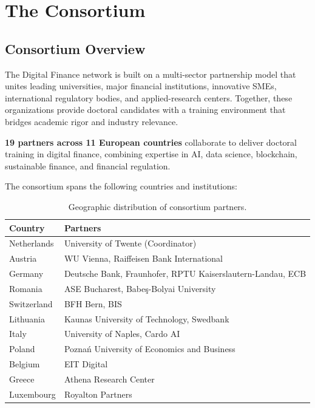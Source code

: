 \chapter{The Consortium}
\label{ch:consortium}

\section{Consortium Overview}
\label{sec:consortium-overview}

The Digital Finance network is built on a multi-sector partnership model that
unites leading universities, major financial institutions, innovative SMEs,
international regulatory bodies, and applied-research centers.  Together, these
organizations provide doctoral candidates with a training environment that
bridges academic rigor and industry relevance.

\begin{highlightbox}
\textbf{19 partners across 11 European countries} collaborate to deliver
doctoral training in digital finance, combining expertise in AI, data science,
blockchain, sustainable finance, and financial regulation.
\end{highlightbox}

\vspace{4pt}

\noindent The consortium spans the following countries and institutions:

\vspace{4pt}

\begin{table}[h]
\centering
\begin{tabularx}{\textwidth}{@{}l X@{}}
  \toprule
  \textbf{Country} & \textbf{Partners} \\
  \midrule
  Netherlands   & University of Twente (Coordinator) \\
  Austria       & WU Vienna, Raiffeisen Bank International \\
  Germany       & Deutsche Bank, Fraunhofer, RPTU Kaiserslautern-Landau, ECB \\
  Romania       & ASE Bucharest, Babe\c{s}-Bolyai University \\
  Switzerland   & BFH Bern, BIS \\
  Lithuania     & Kaunas University of Technology, Swedbank \\
  Italy         & University of Naples, Cardo AI \\
  Poland        & Pozna\'{n} University of Economics and Business \\
  Belgium       & EIT Digital \\
  Greece        & Athena Research Center \\
  Luxembourg    & Royalton Partners \\
  \bottomrule
\end{tabularx}
\caption{Geographic distribution of consortium partners.}
\label{tab:country-partners}
\end{table}

